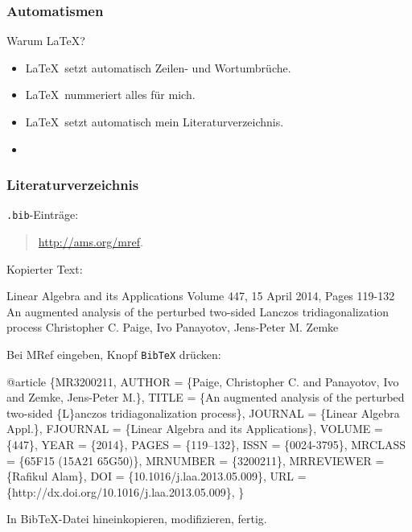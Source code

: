 \documentclass[10pt]{beamer} %
\begin{document}
\begin{frame}
  \frametitle{Automatismen}

  Warum \LaTeX?
  \begin{itemize}
  \item<1-> \LaTeX\ setzt automatisch Zeilen- und Wortumbrüche.
  \item<2-> \LaTeX\ nummeriert alles für mich.
  \item<3-> \LaTeX\ setzt automatisch mein Literaturverzeichnis.
  \item<4-> 
  \end{itemize}

  \vspace*{2em}


\end{frame}
\begin{frame}[fragile]
  \frametitle{Literaturverzeichnis}

  \texttt{.bib}-Einträge:

  \begin{quotation}
    \url{http://ams.org/mref}.
  \end{quotation}

  Kopierter Text:\vspace*{-.6em}
\begin{semiverbatim}\tiny
  Linear Algebra and its Applications
  Volume 447, 15 April 2014, Pages 119-132
  An augmented analysis of the perturbed two-sided Lanczos
    tridiagonalization process
  Christopher C. Paige, Ivo Panayotov, Jens-Peter M. Zemke
\end{semiverbatim}

  Bei MRef eingeben, Knopf \texttt{BibTeX} drücken:\vspace*{-.6em}
\begin{semiverbatim}\tiny
@article \{MR3200211,
    AUTHOR = \{Paige, Christopher C. and Panayotov, Ivo and Zemke, Jens-Peter
              M.\},
     TITLE = \{An augmented analysis of the perturbed two-sided \{L\}anczos
              tridiagonalization process\},
   JOURNAL = \{Linear Algebra Appl.\},
  FJOURNAL = \{Linear Algebra and its Applications\},
    VOLUME = \{447\},
      YEAR = \{2014\},
     PAGES = \{119--132\},
      ISSN = \{0024-3795\},
   MRCLASS = \{65F15 (15A21 65G50)\},
  MRNUMBER = \{3200211\},
MRREVIEWER = \{Rafikul Alam\},
       DOI = \{10.1016/j.laa.2013.05.009\},
       URL = \{http://dx.doi.org/10.1016/j.laa.2013.05.009\},
\}
\end{semiverbatim}
  \vspace*{-.6em}
  In BibTeX-Datei hineinkopieren, modifizieren, fertig.

\end{frame}
\end{document}
